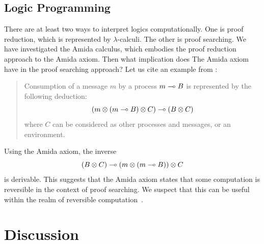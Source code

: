  \subsection{Logic Programming}

 There are at least two ways to interpret logics computationally.
 One is proof reduction, which is represented by $\lambda$-calculi.
 The other is proof searching.
 We have investigated the Amida calculus, which embodies the proof reduction
 approach to the Amida axiom.
 Then what implication does
 The Amida axiom have in
 the proof searching approach?
 Let us cite an example from \citet[A.2]{kobayashi-yonezawa}:
 \begin{quote}
  Consumption of a message $m$ by a process $m\multimap B$ is represented by
  the following deduction:
  \[
   (m\otimes(m\multimap B)\otimes C)\multimap (B\otimes C)
  \]
  where $C$ can be considered as other processes and messages, or an environment.
 \end{quote}
 Using the Amida axiom,
 the inverse
 \[
  (B\otimes C)\multimap (m\otimes (m\multimap B))\otimes C
 \]
 is derivable.
 This suggests that the Amida axiom states that some
 computation is reversible in the context of proof searching.
 We suspect that this can be
 useful within the realm of reversible computation~\citep{revcon}.

\section{Discussion}


